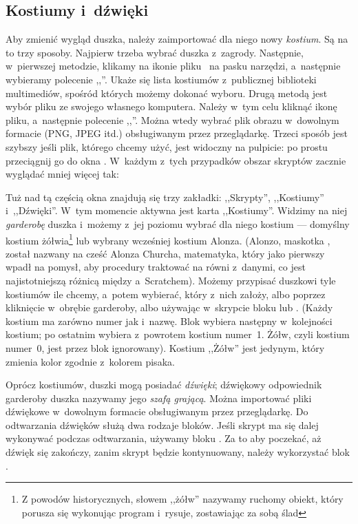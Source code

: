 \documentclass[a4paper]{report}
\begin{document}
\subsection{Kostiumy i~dźwięki}

Aby zmienić wygląd duszka, należy zaimportować dla niego nowy \emph{kostium}. Są na to trzy sposoby. Najpierw trzeba wybrać duszka z~zagrody. Następnie, w~pierwszej metodzie, klikamy na ikonie pliku~ na pasku narzędzi, a~następnie wybieramy polecenie ,,''. Ukaże się lista kostiumów z~publicznej biblioteki multimediów, spośród których możemy dokonać wyboru. Drugą metodą jest wybór pliku ze swojego własnego komputera. Należy w~tym celu kliknąć ikonę pliku, a~następnie polecenie ,,''. Można wtedy wybrać plik obrazu w~dowolnym formacie (PNG, JPEG itd.) obsługiwanym przez przeglądarkę. Trzeci sposób jest szybszy jeśli plik, którego chcemy użyć, jest widoczny na pulpicie: po prostu przeciągnij go do okna . W~każdym z~tych przypadków obszar skryptów zacznie wyglądać mniej więcej tak:\nopagebreak


Tuż nad tą częścią okna znajdują się trzy zakładki: ,,Skrypty'', ,,Kostiumy'' i~,,Dźwię\-ki''. W~tym momencie aktywna jest karta ,,Kostiumy''. Widzimy na niej \emph{garderobę} duszka i~możemy z~jej poziomu wybrać dla niego kostium --- domyślny kostium żółwia\footnote{Z powodów historycznych, słowem ,,żółw'' nazywamy ruchomy obiekt, który porusza się wykonując program i~rysuje, zostawiając za sobą ślad} lub wybrany wcześniej kostium Alonza. (Alonzo, maskotka , został nazwany na cześć Alonza Churcha, matematyka, który jako pierwszy wpadł na pomysł, aby procedury traktować na równi z~danymi, co jest najistotniejszą różnicą między  a~Scratchem). Możemy przypisać duszkowi tyle kostiumów ile chcemy, a~potem wybierać, który z~nich założy, albo poprzez kliknięcie w~obrębie garderoby, albo używając w~skrypcie bloku  lub . (Każdy kostium ma zarówno numer jak i~nazwę. Blok  wybiera następny w~kolejności kostium; po ostatnim wybiera z~powrotem kostium numer~1. Żółw, czyli kostium numer~0, jest przez blok  ignorowany). Kostium ,,Żółw'' jest jedynym, który zmienia kolor zgodnie z~kolorem pisaka.

Oprócz kostiumów, duszki mogą posiadać \emph{dźwięki}; dźwiękowy odpowiednik garderoby duszka nazywamy jego \emph{szafą grającą}. Można importować pliki dźwiękowe w~dowolnym formacie obsługiwanym przez przeglądarkę. Do odtwarzania dźwięków służą dwa rodzaje bloków. Jeśli skrypt ma się dalej wykonywać podczas odtwarzania, używamy bloku . Za to aby poczekać, aż dźwięk się zakończy, zanim skrypt będzie kontynuowany, należy wykorzystać blok .
\end{document}
